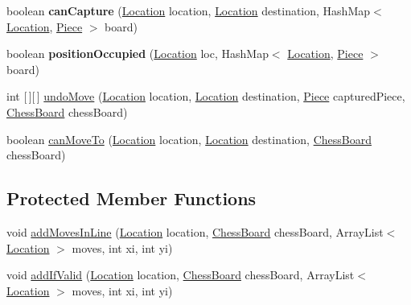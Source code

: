 \begin{DoxyCompactItemize}
boolean {\bfseries can\+Capture} (\hyperlink{class_game_1_1_location}{Location} location, \hyperlink{class_game_1_1_location}{Location} destination, Hash\+Map$<$ \hyperlink{class_game_1_1_location}{Location}, \hyperlink{class_game_1_1_piece}{Piece} $>$ board)
\item 
\mbox{\label{class_game_1_1_piece_ac436d4c58f325d6ce7ab1000098a00d1}} 
boolean {\bfseries position\+Occupied} (\hyperlink{class_game_1_1_location}{Location} loc, Hash\+Map$<$ \hyperlink{class_game_1_1_location}{Location}, \hyperlink{class_game_1_1_piece}{Piece} $>$ board)
\item 
int \mbox{[}$\,$\mbox{]}\mbox{[}$\,$\mbox{]} \hyperlink{class_game_1_1_piece_acc0658b488de0531c94899ff16f81860}{undo\+Move} (\hyperlink{class_game_1_1_location}{Location} location, \hyperlink{class_game_1_1_location}{Location} destination, \hyperlink{class_game_1_1_piece}{Piece} captured\+Piece, \hyperlink{class_game_1_1_chess_board}{Chess\+Board} chess\+Board)
\item 
boolean \hyperlink{class_game_1_1_piece_a8db59115b31d53cfb6e8b31df38f22ab}{can\+Move\+To} (\hyperlink{class_game_1_1_location}{Location} location, \hyperlink{class_game_1_1_location}{Location} destination, \hyperlink{class_game_1_1_chess_board}{Chess\+Board} chess\+Board)
\end{DoxyCompactItemize}
\subsection*{Protected Member Functions}
\begin{DoxyCompactItemize}
\item 
void \hyperlink{class_game_1_1_piece_a693ab25eaea3b524fc34ddd0da52576e}{add\+Moves\+In\+Line} (\hyperlink{class_game_1_1_location}{Location} location, \hyperlink{class_game_1_1_chess_board}{Chess\+Board} chess\+Board, Array\+List$<$ \hyperlink{class_game_1_1_location}{Location} $>$ moves, int xi, int yi)
\item 
void \hyperlink{class_game_1_1_piece_a66a1001c4c88e92b73575c332c29b01e}{add\+If\+Valid} (\hyperlink{class_game_1_1_location}{Location} location, \hyperlink{class_game_1_1_chess_board}{Chess\+Board} chess\+Board, Array\+List$<$ \hyperlink{class_game_1_1_location}{Location} $>$ moves, int xi, int yi)
\end{DoxyCompactItemize}
